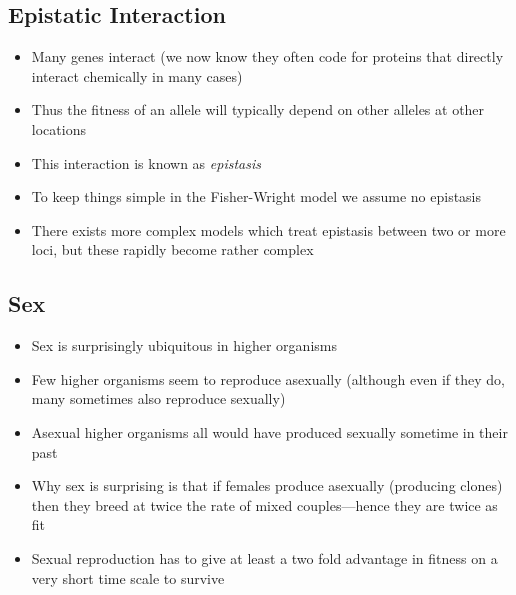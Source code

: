 
\begin{slide}
\section{Epistatic Interaction}

\begin{PauseHighLight}
  \begin{itemize}
  \item Many genes interact (we now know they often code for proteins
    that directly interact chemically in many cases)\pause
  \item Thus the fitness of an allele will typically depend on other
    alleles at other locations\pause
  \item This interaction is known as \emph{epistasis}\pause
  \item To keep things simple in the Fisher-Wright model we assume no
    epistasis\pause
  \item There exists more complex models which treat epistasis between
    two or more loci, but these rapidly become rather complex\pause    
  \end{itemize}
\end{PauseHighLight}

\end{slide}


\begin{slide}
\section[-1]{Sex}

\begin{PauseHighLight}
  \begin{itemize}
  \item Sex is surprisingly ubiquitous in higher organisms\pause
  \item Few higher organisms seem to reproduce asexually (although
    even if they do, many sometimes also reproduce sexually)\pause
  \item Asexual higher organisms all would have produced sexually
    sometime in their past\pause
  \item Why sex is surprising is that if females produce asexually
    (producing clones) then they breed at twice the rate of mixed
    couples\pause---hence they are twice as fit\pauseb
  \item Sexual reproduction has to give at least a two fold advantage in
    fitness on a very short time scale to survive\pause
  \end{itemize}
\end{PauseHighLight}

\end{slide}

